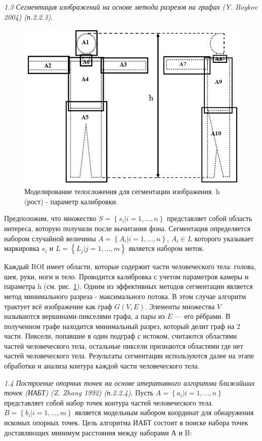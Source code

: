 \textit{1.3 Сегментация изображений на основе метода разрезов на графах (Y. Boykov 2004) (п.2.2.3).}

\begin{figure}[ht!]
\centering
\includegraphics [width=0.45\linewidth] {images/h111.png}
\begin{center}
\caption{Моделирование телосложения для сегментации изображения. h (рост) - параметр калибровки.} \label{img1}
\end{center}
\end{figure}
Предположим, что множество $S=\left\{s_i|i=1, ..., n\right\}$ представляет собой область интереса, которую получили после вычитания фона.
Сегментация определяется набором случайной величины $A=\left\{A_i|i=1, ..., n\right\}$, $A_i\in L $ которого указывает маркировка $s_i$ и $L=\left\{L_j|j=1, ..., m\right\}$ является набором меток.

Каждый ROI имеет области, которые содержит части человеческого тела: голова, шея, руки, ноги и тело. Проводится калибровка с учетом параметров камеры и параметра h (см. рис. \ref{img1}). Одним из эффективных методов сегментации является метод минимального разреза - максимального потока. В этом случае алгоритм трактует всё изображение как граф $G\left(V, E\right)$. Элементы множества $V$ называются вершинами-пикселями графа, а пары из $E$ — его рёбрами. В полученном графе находится минимальный разрез, который делит граф на 2 части. Пиксели, попавшие в один подграф с истоком, считаются областями частей человеческого тела, остальные пиксели признаются областями где нет частей человеческого тела. Результаты сегментации используются далее на этапе обработки и анализа контура каждой части человеческого тела.

\textit{1.4 Построение опорных точек на основе итеративного алгоритма ближайших точек (ИАБТ) (Z. Zhang 1992) (п.2.2.4).} Пусть $A=\left\{a_i| i=1, ..., n\right\}$ представляет собой набор точек контура частей человеческого тела. $B=\left\{b_i| i=1, ..., m\right\}$ является модельным набором координат для обнаружения искомых опорных точек. Цель алгоритма ИАБТ состоит в поиске набора точек доставляющих минимум расстояния между наборами А и B:

